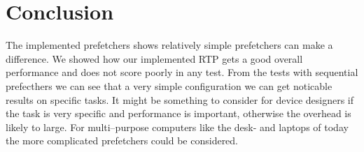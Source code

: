 \section{Conclusion} %


The implemented prefetchers shows relatively simple prefetchers can
make a difference. We showed how our implemented RTP gets a good
overall performance and does not score poorly in any test. From the
tests with sequential prefecthers we can see that a very simple
configuration we can get noticable results on specific tasks. It might
be something to consider for device designers if the task is very
specific and performance is important, otherwise the overhead is
likely to large. For multi--purpose computers
like the desk- and laptops of today the more complicated prefetchers
could be considered. 
